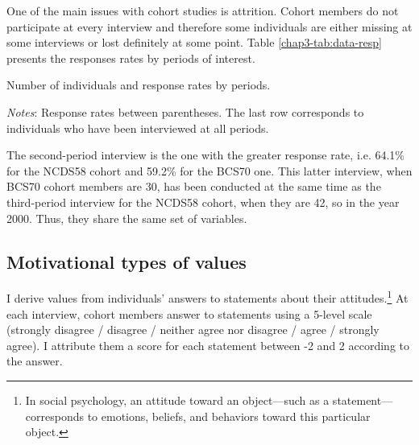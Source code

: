 One of the main issues with cohort studies is attrition. 
Cohort members do not participate at every interview and therefore some individuals are either missing at some interviews or lost definitely at some point.
%
Table \ref{chap3-tab:data-resp} presents the responses rates by periods of interest.
\begin{table}[!tb]
    \centering
    \caption{Number of individuals and response rates by periods.}
    \label{chap3-tab:data-resp}
    \begin{threeparttable}
        \setlength{\tabcolsep}{15pt}
        
        \begin{tablenotes}[flushleft]
            \footnotesize{\item \textit{Notes}: Response rates between parentheses. The last row corresponds to individuals who have been interviewed at all periods.}
        \end{tablenotes}
    \end{threeparttable}
\end{table}
%
The second-period interview is the one with the greater response rate, i.e. 64.1\% for the NCDS58 cohort and 59.2\% for the BCS70 one. This latter interview, when BCS70 cohort members are 30, has been conducted at the same time as the third-period interview for the NCDS58 cohort, when they are 42, so in the year 2000. Thus, they share the same set of variables.

\subsection{Motivational types of values}

I derive values from individuals' answers to statements about their attitudes.\footnote{In social psychology, an attitude toward an object---such as a statement---corresponds to emotions, beliefs, and behaviors toward this particular object.} At each interview, cohort members answer to statements using a 5-level scale (strongly disagree / disagree / neither agree nor disagree / agree / strongly agree). I attribute them a score for each statement between -2 and 2 according to the answer.

